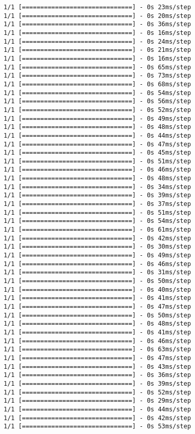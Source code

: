 \documentclass[11pt]{article}
\begin{document}
\begin{Verbatim}[commandchars=\\\{\}]
1/1 [==============================] - 0s 23ms/step
1/1 [==============================] - 0s 20ms/step
1/1 [==============================] - 0s 36ms/step
1/1 [==============================] - 0s 16ms/step
1/1 [==============================] - 0s 24ms/step
1/1 [==============================] - 0s 21ms/step
1/1 [==============================] - 0s 16ms/step
1/1 [==============================] - 0s 65ms/step
1/1 [==============================] - 0s 73ms/step
1/1 [==============================] - 0s 68ms/step
1/1 [==============================] - 0s 54ms/step
1/1 [==============================] - 0s 56ms/step
1/1 [==============================] - 0s 52ms/step
1/1 [==============================] - 0s 49ms/step
1/1 [==============================] - 0s 48ms/step
1/1 [==============================] - 0s 44ms/step
1/1 [==============================] - 0s 47ms/step
1/1 [==============================] - 0s 45ms/step
1/1 [==============================] - 0s 51ms/step
1/1 [==============================] - 0s 46ms/step
1/1 [==============================] - 0s 48ms/step
1/1 [==============================] - 0s 34ms/step
1/1 [==============================] - 0s 39ms/step
1/1 [==============================] - 0s 37ms/step
1/1 [==============================] - 0s 51ms/step
1/1 [==============================] - 0s 54ms/step
1/1 [==============================] - 0s 61ms/step
1/1 [==============================] - 0s 42ms/step
1/1 [==============================] - 0s 30ms/step
1/1 [==============================] - 0s 49ms/step
1/1 [==============================] - 0s 46ms/step
1/1 [==============================] - 0s 31ms/step
1/1 [==============================] - 0s 50ms/step
1/1 [==============================] - 0s 40ms/step
1/1 [==============================] - 0s 41ms/step
1/1 [==============================] - 0s 47ms/step
1/1 [==============================] - 0s 50ms/step
1/1 [==============================] - 0s 48ms/step
1/1 [==============================] - 0s 41ms/step
1/1 [==============================] - 0s 46ms/step
1/1 [==============================] - 0s 63ms/step
1/1 [==============================] - 0s 47ms/step
1/1 [==============================] - 0s 43ms/step
1/1 [==============================] - 0s 36ms/step
1/1 [==============================] - 0s 39ms/step
1/1 [==============================] - 0s 52ms/step
1/1 [==============================] - 0s 29ms/step
1/1 [==============================] - 0s 44ms/step
1/1 [==============================] - 0s 42ms/step
1/1 [==============================] - 0s 53ms/step

\end{Verbatim}
\end{document}
